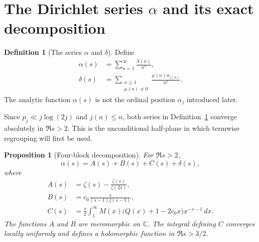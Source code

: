 \documentclass[11pt]{amsart}
\numberwithin{equation}{section}
\theoremstyle{plain}
\newtheorem{proposition}[theorem]{Proposition}
\theoremstyle{definition}
\newtheorem{definition}[theorem]{Definition}
\theoremstyle{remark}
\newcommand{\C}{\mathbb C}
\begin{document}
\section{The Dirichlet series \texorpdfstring{$\alpha$}{alpha} and its exact decomposition}
\label{sec:alpha-decomposition}

\begin{definition}[The series $\alpha$ and $\delta$]
\label{def:alpha-delta}
Define
\begin{align}
\alpha(s)&=\sum_{n=1}^{\infty}\frac{S(n)}{n^s},
\label{eq:alpha-definition}\\
\delta(s)&=
\sum_{\substack{n\ge1\\ \mu(n)\ne0}}
\frac{\mu(n)w_{j(n)}}{n^s}.
\label{eq:delta-definition}
\end{align}
The analytic function $\alpha(s)$ is not the ordinal position $\alpha_j$
introduced later.
\end{definition}

Since $p_j\ll j\log(2j)$ and $j(n)\le n$, both series in
Definition~\ref{def:alpha-delta} converge absolutely in $\Re s>2$.  This is
the unconditional half-plane in which termwise regrouping will first be used.

\begin{proposition}[Four-block decomposition]
\label{prop:alpha-four-blocks}
For $\Re s>2$,
\begin{equation}
\alpha(s)=A(s)+B(s)+C(s)+\delta(s),
\label{eq:alpha-ABCD}
\end{equation}
where
\begin{align}
A(s)&=\zeta(s)-\frac{\zeta(s)}{\zeta(2s)},
\label{eq:A-definition}\\
B(s)&=c_0\frac{s}{(s-1)\zeta(s-1)},
\label{eq:B-definition}\\
C(s)&=\frac{s}{2}\int_1^\infty
M(x)\bigl(Q(x)+1-2c_0x\bigr)x^{-s-1}\,dx.
\label{eq:C-definition}
\end{align}
The functions $A$ and $B$ are meromorphic on $\C$.  The integral defining
$C$ converges locally uniformly and defines a holomorphic function in
$\Re s>3/2$.
\end{proposition}
\end{document}
